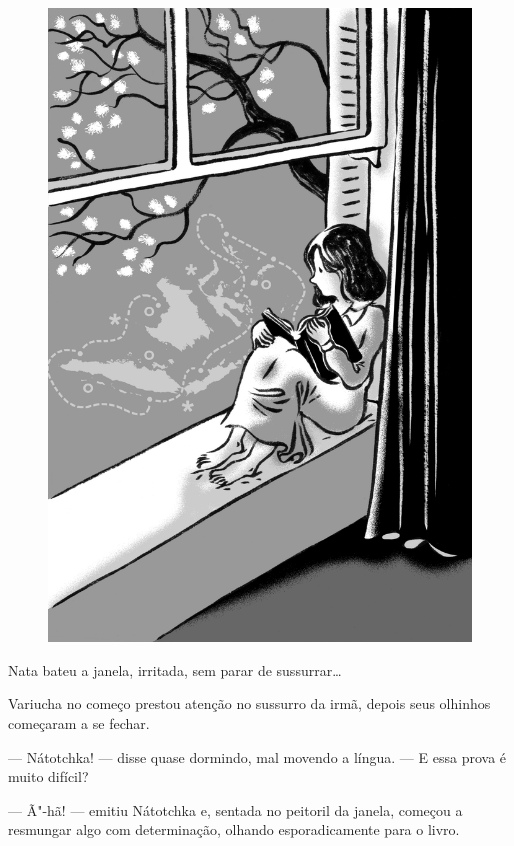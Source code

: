 \begin{figure}%
\vspace*{-2.1cm}
\hspace*{-2.2cm}\includegraphics{./imgs/cena12.jpg}
\end{figure}

Nata bateu a janela, irritada, sem parar de sussurrar\ldots{}

Variucha no começo prestou atenção no sussurro da irmã, depois seus
olhinhos começaram a se fechar.

--- Nátotchka! --- disse quase dormindo, mal movendo a língua. --- E
essa prova é muito difícil?

--- Ã"-hã! --- emitiu Nátotchka e, sentada no peitoril da janela, começou
a resmungar algo com determinação, olhando esporadicamente para o livro.

